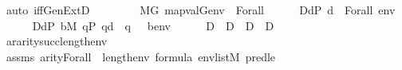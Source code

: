 \begin{isabellebody}
\ {\isacharparenleft}{\kern0pt}auto\ iff{\isacharcolon}{\kern0pt}GenExtD{\isacharparenright}{\kern0pt}\isanewline
\ \ \isamarkupfalse%
\isanewline
\ \ \ \ \isamarkupfalse%
\ {\isachardoublequoteopen}M{\isacharbrackleft}{\kern0pt}G{\isacharbrackright}{\kern0pt}{\isacharcomma}{\kern0pt}\ map{\isacharparenleft}{\kern0pt}val{\isacharparenleft}{\kern0pt}G{\isacharparenright}{\kern0pt}{\isacharcomma}{\kern0pt}env{\isacharparenright}{\kern0pt}\ {\isasymTurnstile}\ Forall{\isacharparenleft}{\kern0pt}{\isasymphi}{\isacharparenright}{\kern0pt}{\isachardoublequoteclose}\isanewline
\ \ \ \ \isamarkupfalse%
\ {\isacharquery}{\kern0pt}D{}{\isacharequal}{\kern0pt}{\isachardoublequoteopen}{\isacharbraceleft}{\kern0pt}d{\isasymin}P{\isachardot}{\kern0pt}\ {\isacharparenleft}{\kern0pt}d\ {\isasymtturnstile}\ Forall{\isacharparenleft}{\kern0pt}{\isasymphi}{\isacharparenright}{\kern0pt}\ env{\isacharparenright}{\kern0pt}{\isacharbraceright}{\kern0pt}{\isachardoublequoteclose}\isanewline
\ \ \ \ \isamarkupfalse%
\ {\isacharquery}{\kern0pt}D{}{\isacharequal}{\kern0pt}{\isachardoublequoteopen}{\isacharbraceleft}{\kern0pt}d{\isasymin}P{\isachardot}{\kern0pt}\ {\isasymexists}b{\isasymin}M{\isachardot}{\kern0pt}\ {\isasymforall}q{\isasymin}P{\isachardot}{\kern0pt}\ q{\isasympreceq}d\ {\isasymlongrightarrow}\ {\isasymnot}{\isacharparenleft}{\kern0pt}q\ {\isasymtturnstile}\ {\isasymphi}\ {\isacharparenleft}{\kern0pt}{\isacharbrackleft}{\kern0pt}b{\isacharbrackright}{\kern0pt}{\isacharat}{\kern0pt}env{\isacharparenright}{\kern0pt}{\isacharparenright}{\kern0pt}{\isacharbraceright}{\kern0pt}{\isachardoublequoteclose}\isanewline
\ \ \ \ \isamarkupfalse%
\ D\ \ {\isachardoublequoteopen}D\ {\isasymequiv}\ {\isacharquery}{\kern0pt}D{}\ {\isasymunion}\ {\isacharquery}{\kern0pt}D{}{\isachardoublequoteclose}\isanewline
\ \ \ \ \isamarkupfalse%
\ ar{\isasymphi}{\isacharcolon}{\kern0pt}{\isachardoublequoteopen}arity{\isacharparenleft}{\kern0pt}{\isasymphi}{\isacharparenright}{\kern0pt}{\isasymle}succ{\isacharparenleft}{\kern0pt}length{\isacharparenleft}{\kern0pt}env{\isacharparenright}{\kern0pt}{\isacharparenright}{\kern0pt}{\isachardoublequoteclose}\ \isanewline
\ \ \ \ \ \ \isamarkupfalse%
\ assms\ {\isacartoucheopen}arity{\isacharparenleft}{\kern0pt}Forall{\isacharparenleft}{\kern0pt}{\isasymphi}{\isacharparenright}{\kern0pt}{\isacharparenright}{\kern0pt}\ {\isasymle}\ length{\isacharparenleft}{\kern0pt}env{\isacharparenright}{\kern0pt}{\isacartoucheclose}\ {\isacartoucheopen}{\isasymphi}{\isasymin}formula{\isacartoucheclose}\ {\isacartoucheopen}env{\isasymin}list{\isacharparenleft}{\kern0pt}M{\isacharparenright}{\kern0pt}{\isacartoucheclose}\ pred{\isacharunderscore}{\kern0pt}le{}\ \isanewline

\end{isabellebody}
